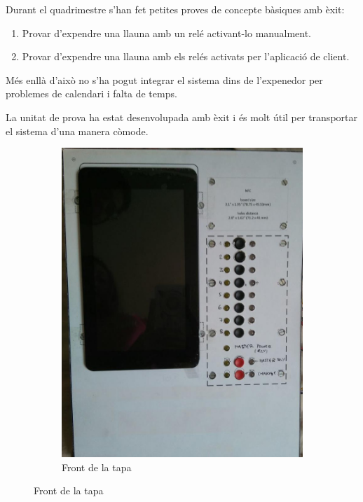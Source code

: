 Durant el quadrimestre s'han fet petites proves de concepte bàsiques amb èxit:
\begin{enumerate}
\item Provar d'expendre una llauna amb un relé activant-lo manualment.
\item Provar d'expendre una llauna amb els relés activats per l'aplicació de client.
\end{enumerate}

Més enllà d'això no s'ha pogut integrar el sistema dins de l'expenedor per problemes de calendari i falta de temps.

La unitat de prova ha estat desenvolupada amb èxit i és molt útil per transportar el sistema d'una manera còmode.

\begin{figure}[H]
	\centering
	\begin{subfigure}[b]{0.45\textwidth}
		\includegraphics[width=\textwidth]{images/demonstrator_front}
		\caption{Front de la tapa}
		\label{fig:admin1}
	\end{subfigure}

\end{figure}
